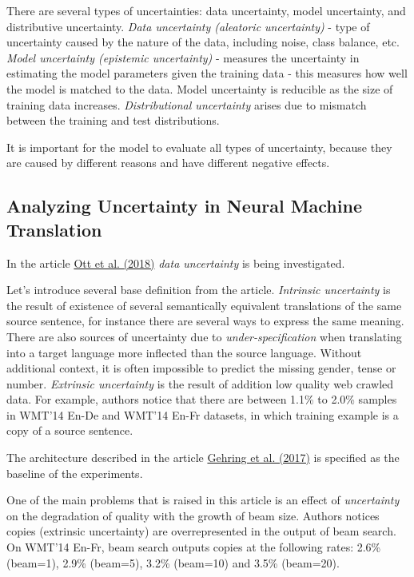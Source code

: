 \documentclass[a4paper,14pt]{extarticle}
\newcommand{\bibref}[3]{\hyperlink{#1}{#2 (#3)}}
\begin{document}
	There are several types of uncertainties: data uncertainty, model uncertainty, and distributive uncertainty. \textit{Data uncertainty (aleatoric uncertainty)} - type of uncertainty caused by the nature of the data, including noise, class balance, etc. \textit{Model uncertainty (epistemic uncertainty)} - measures the uncertainty in estimating the model parameters given the training data - this measures how well the model is matched to the data. Model uncertainty is reducible as the size of training data increases. \textit{Distributional uncertainty} arises due to mismatch between the training and test distributions. 
	
	It is important for the model to evaluate all types of uncertainty, because they are caused by different reasons and have different negative effects.
	
	\subsection{Analyzing Uncertainty in Neural Machine Translation}
	In the article \bibref{anal_uncertainty}{Ott et al.}{2018} \textit{data uncertainty} is being investigated.
	
	Let's introduce several base definition from the article. \textit{Intrinsic uncertainty} is the result of existence of several semantically equivalent translations of the same source sentence, for instance there are several ways to express the same meaning. There are also sources of uncertainty due to \textit{under-specification} when translating into a target language more inflected than the source language. Without additional context, it is often impossible to predict the missing gender, tense or number. \textit{Extrinsic uncertainty} is the result of addition low quality web crawled data. For example, authors notice that there are between 1.1\% to 2.0\% samples in  WMT’14 En-De and WMT’14 En-Fr datasets, in which training example is a copy of a source sentence.
	
	The architecture described in the article \bibref{fconv}{Gehring et al.}{2017} is specified as the baseline of the experiments.
	
	One of the main problems that is raised in this article is an effect of \textit{uncertainty} on the degradation of quality with the growth of beam size. Authors notices copies (extrinsic uncertainty) are overrepresented in the output of beam search. On WMT'14 En-Fr, beam search outputs copies at the following rates: 2.6\% (beam=1), 2.9\% (beam=5), 3.2\% (beam=10) and 3.5\% (beam=20).
	
\end{document}
